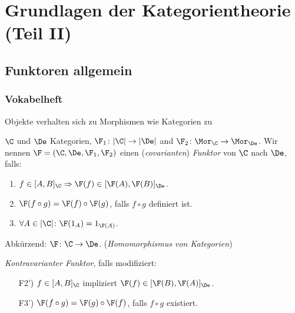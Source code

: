\section{Grundlagen der Kategorientheorie (Teil II)}

\subsection{Funktoren allgemein}

\begin{frame}
  \frametitle{Vokabelheft}
  Objekte verhalten sich zu Morphismen wie
  Kategorien zu 
  \pause
  \begin{defn*}
  $\C$ und $\De$ Kategorien, $\F_1 \colon |\C| \to |\De|$ and $\F_2 \colon \Mor_\C\to \Mor_\De$. 
  Wir nennen $\F = (\C, \De, \F_1, \F_2)$ einen (\emph{covarianten}) \emph{Funktor} von $\C$ nach $\De$, falls:
  \begin{enumerate}[F1)]
    \item $f \in [A, B]_\C \Rightarrow \F(f) \in [\F(A), \F(B)]_\De$.
    \item $\F(f \circ g) = \F(f) \circ \F(g)$, falls $f \circ g$ definiert ist.
    \item $\forall A \in |\C| \colon \F(1_A) = 1_{\F(A)}$.
  \end{enumerate}
  Abkürzend: $\F \colon \C \to \De$. (\emph{Homomorphismus von Kategorien})

  \pause
  \vspace{1em}
  \emph{Kontravarianter Funktor}, falls modifiziert:
\begin{enumerate}[F1')]
  \item[F2')] $f \in [A, B]_\C$ impliziert $\F(f) \in [\F(B), \F(A)]_\De$.
  \item[F3')] $\F(f \circ g) = \F(g) \circ \F(f)$, falls $f \circ g$ existiert.
\end{enumerate}
  \end{defn*}
\end{frame}

